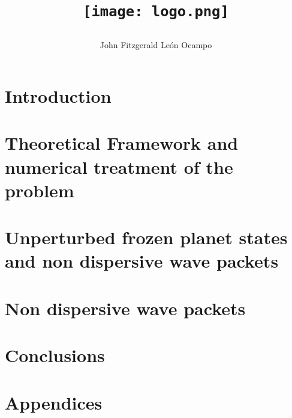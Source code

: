 \documentclass[12pt,twoside]{report}
\title{
{\texttt{[image: logo.png]}}



}
\author{John Fitzgerald León Ocampo}
\begin{document}
\maketitle


\tableofcontents

\begin{abstract}
\end{abstract}


\chapter{Introduction}


\chapter{Theoretical Framework and numerical treatment of the problem}


\chapter{Unperturbed frozen planet states and non dispersive wave packets}


\chapter{Non dispersive wave packets}


\chapter{Conclusions}



\appendix
\chapter*{Appendices}

\end{document}
